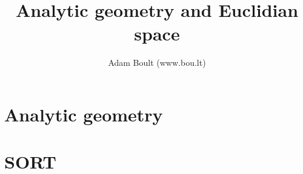 \documentclass[oneside]{book}
\begin{document}
\author{Adam Boult (www.bou.lt)}
\title{Analytic geometry and Euclidian space}
\maketitle

\setcounter{tocdepth}{0}
\tableofcontents

\part{Analytic geometry}









\part{SORT}

\end{document}
